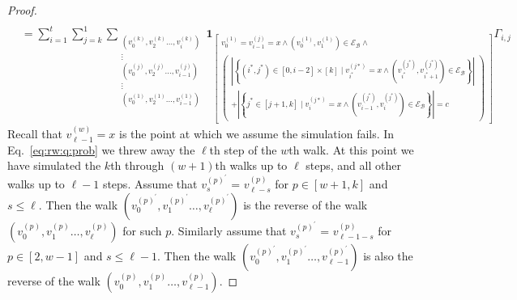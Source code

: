 \documentclass[10]{report}
\begin{document}
\begin{proof}
\begin{align}
\\
\label{eq:rw:q:prob}
&= 
\sum_{i = 1}^{t} 
\sum_{j =k}^{1} 
\sum_{\substack{
	\left (v_0^{(k)}, v_2^{(k)} \dots, v_i^{(k)} \right ) \\
	\vdots \\
	\left (v_0^{(j)}, v_2^{(j)} \dots, v_{i-1}^{(j)} \right ) \\
	\vdots \\
	\left (v_0^{(1)}, v_2^{(1)} \dots, v_{i-1}^{(1)} \right ) \\
}}
\mathbf{1}_{ \left [\substack{
	v_0^{(1)} = v_{i-1}^{(j)} = x 
			\wedge \left ( v_0^{(1)}, v_1^{(1)} \right ) \in \mathcal{E}_\mathcal{B} 
			\wedge \\
	\left ( \substack{
		\left | \left \{ 
				(i^*,j^*) \in [0, i-2] \times [k] 
						\mid v_{i^*}^{(j*)} = x 
						\wedge \left ( v_{i^*}^{(j^*)}, v_{i^*+1}^{(j^*)} \right ) \in \mathcal{E}_\mathcal{B}
		\right \} \right | \\
		+ \left | \left \{ 
				j^* \in [j + 1, k] 
						\mid v_{i}^{(j*)} = x 
						\wedge \left ( v_{i - 1}^{(j^*)}, v_{i}^{(j^*)} \right ) \in \mathcal{E}_\mathcal{B}
		\right \} \right | = c
	} \right )
}\right ]}
\Gamma_{i,j}
\end{align}
%
Recall that $v_{\ell-1}^{(w)} = x$ is the point at which we assume the simulation fails.
In Eq.~\eqref{eq:rw:q:prob} we threw away the $\ell$th step of the $w$th walk. 
At this point we have simulated the $k$th through $(w+1)$th walks up to $\ell$ steps, and all other walks up to $\ell-1$ steps.
Assume that $v^{(p)^\prime}_s$ = $v^{(p)}_{\ell - s}$ for $p \in [w+1, k]$ and $s \leq \ell$.
Then the walk $\left ( v_0^{(p)^\prime}, v_1^{(p)^\prime} \dots, v_\ell^{(p)^\prime} \right )$ is the reverse of the walk $\left ( v_0^{(p)}, v_1^{(p)} \dots, v_\ell^{(p)} \right )$ for such $p$.
Similarly assume that $v^{(p)^\prime}_s$ = $v^{(p)}_{\ell -1 - s}$ for $p \in [2, w-1]$ and $s \leq \ell-1$.
Then the walk $	\left ( v_0^{(p)^\prime}, v_1^{(p)^\prime} \dots, v_{\ell-1}^{(p)^\prime} \right )$ is also the reverse of the walk $\left ( v_0^{(p)}, v_{1}^{(p)} \dots, v_{\ell-1}^{(p)} \right )$.

\end{proof}
\end{document}
